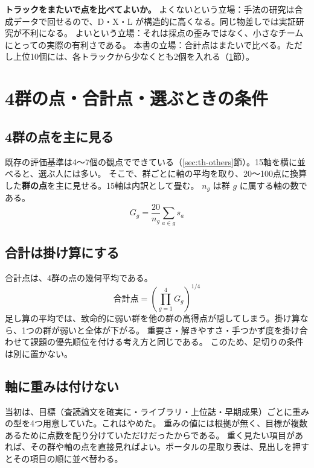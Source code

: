 \documentclass[a4paper,10pt]{ltjsarticle}
\begin{document}
\begin{debate}
\textbf{トラックをまたいで点を比べてよいか。}
よくないという立場：手法の研究は合成データで回せるので、D・X・L が構造的に高くなる。同じ物差しでは実証研究が不利になる。
よいという立場：それは採点の歪みではなく、小さなチームにとっての実際の有利さである。
本書の立場：合計点はまたいで比べる。ただし上位10個には、各トラックから少なくとも2個を入れる（\ref{sec:th-score}節）。
\end{debate}

\section{4群の点・合計点・選ぶときの条件}\label{sec:th-score}

\subsection{4群の点を主に見る}
既存の評価基準は4〜7個の観点でできている（\ref{sec:th-others}節）。15軸を横に並べると、選ぶ人には多い。
そこで、群ごとに軸の平均を取り、20〜100点に換算した\textbf{群の点}を主に見せる。15軸は内訳として畳む。
$n_g$ は群 $g$ に属する軸の数である。
\begin{equation}
  G_g = \frac{20}{n_g} \sum_{a \in g} s_a
  \label{eq:th-group}
\end{equation}

\subsection{合計は掛け算にする}
合計点は、4群の点の幾何平均である。
\begin{equation}
  \text{合計点} = \left( \prod_{g=1}^{4} G_g \right)^{1/4}
  \label{eq:th-score}
\end{equation}
足し算の平均では、致命的に弱い群を他の群の高得点が隠してしまう。掛け算なら、1つの群が弱いと全体が下がる。
重要さ・解きやすさ・手つかず度を掛け合わせて課題の優先順位を付ける考え方と同じである。
このため、足切りの条件は別に置かない。

\subsection{軸に重みは付けない}
当初は、目標（査読論文を確実に・ライブラリ・上位誌・早期成果）ごとに重みの型を4つ用意していた。これはやめた。
重みの値には根拠が無く、目標が複数あるために点数を配り分けていただけだったからである。
重く見たい項目があれば、その群や軸の点を直接見ればよい。ポータルの星取り表は、見出しを押すとその項目の順に並べ替わる。
\end{document}
